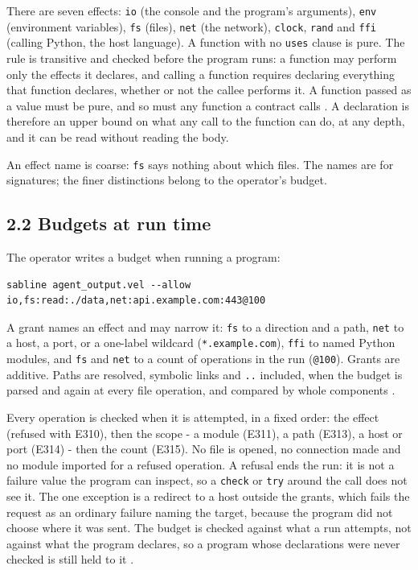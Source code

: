 \documentclass[
]{article}
\begin{document}
There are seven effects: \texttt{io} (the console and the program's
arguments), \texttt{env} (environment variables), \texttt{fs} (files),
\texttt{net} (the network), \texttt{clock}, \texttt{rand} and
\texttt{ffi} (calling Python, the host language). A function with no
\texttt{uses} clause is pure. The rule is transitive and checked before
the program runs: a function may perform only the effects it declares,
and calling a function requires declaring everything that function
declares, whether or not the callee performs it. A function passed as a
value must be pure, and so must any function a contract calls
\citep[section 3.2]{sabline_spec}. A declaration is therefore an upper
bound on what any call to the function can do, at any depth, and it can
be read without reading the body.

An effect name is coarse: \texttt{fs} says nothing about which files.
The names are for signatures; the finer distinctions belong to the
operator's budget.

\subsection{2.2 Budgets at run time}\label{budgets-at-run-time}

The operator writes a budget when running a program:

\begin{verbatim}
sabline agent_output.vel --allow io,fs:read:./data,net:api.example.com:443@100
\end{verbatim}

A grant names an effect and may narrow it: \texttt{fs} to a direction
and a path, \texttt{net} to a host, a port, or a one-label wildcard
(\texttt{*.example.com}), \texttt{ffi} to named Python modules, and
\texttt{fs} and \texttt{net} to a count of operations in the run
(\texttt{@100}). Grants are additive. Paths are resolved, symbolic links
and \texttt{..} included, when the budget is parsed and again at every
file operation, and compared by whole components \citep[sections 4 and
5]{sabline_spec}.

Every operation is checked when it is attempted, in a fixed order: the
effect (refused with E310), then the scope - a module (E311), a path
(E313), a host or port (E314) - then the count (E315). No file is
opened, no connection made and no module imported for a refused
operation. A refusal ends the run: it is not a failure value the program
can inspect, so a \texttt{check} or \texttt{try} around the call does
not see it. The one exception is a redirect to a host outside the
grants, which fails the request as an ordinary failure naming the
target, because the program did not choose where it was sent. The budget
is checked against what a run attempts, not against what the program
declares, so a program whose declarations were never checked is still
held to it \citep[section 6]{sabline_spec}.
\end{document}
